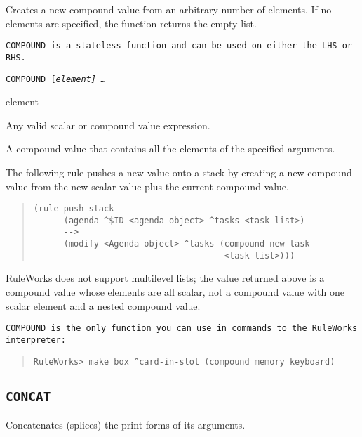 Creates a new compound value from an arbitrary number of elements. If
no elements are specified, the function returns the empty list.

\tt{COMPOUND} is a stateless function and can be used on either the
LHS or RHS.

\Format

\tt{COMPOUND} [\it{element}] \ldots

\begin{arguments}
\item[element]

  Any valid scalar or compound value expression.
\end{arguments}

\ReturnValue

A compound value that contains all the elements of the
specified arguments.

\Example

The following rule pushes a new value onto a stack by creating a new
compound value from the new scalar value plus the current compound
value.

\begin{quote}
\begin{verbatim}
(rule push-stack
      (agenda ^$ID <agenda-object> ^tasks <task-list>)
      -->
      (modify <Agenda-object> ^tasks (compound new-task
                                      <task-list>)))
\end{verbatim}
\end{quote}

\begin{note}
  RuleWorks does not support multilevel lists; the value returned
  above is a compound value whose elements are all scalar, not a
  compound value with one scalar element and a nested compound value.
\end{note}

\tt{COMPOUND} is the only function you can use in commands to the
RuleWorks interpreter:

\begin{quote}
\begin{verbatim}
RuleWorks> make box ^card-in-slot (compound memory keyboard)
\end{verbatim}
\end{quote}

\subsection{\tt{CONCAT}}

Concatenates (splices) the print forms of its arguments.

